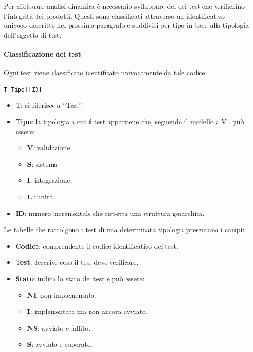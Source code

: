 		Per effettuare analisi dinamica è necessario sviluppare dei dei test che verifichino l'integrità dei prodotti. Questi sono classificati attraverso un identificativo univoco descritto nel prossimo paragrafo e suddivisi per tipo in base alla tipologia dell'oggetto di test.

			\paragraph{Classificazione dei test}\label{ClassificazioneTest}
			Ogni test viene classificato identificato univocamente da tale codice:

			\begin{center}
				\texttt{T[Tipo][ID]}
			\end{center}

			\begin{itemize}
				\item \textbf{T}: si riferisce a ``Test''.
				\item \textbf{Tipo}: la tipologia a cui il test appartiene che, seguendo il modello a V%
				, può essere:
				\begin{itemize}
					\item \textbf{V}: validazione.
					\item \textbf{S}: sistema
					\item \textbf{I}: integrazione.
					\item \textbf{U}: unità.
				\end{itemize}
				\item \textbf{ID}: numero incrementale che rispetta una struttura gerarchica.
			\end{itemize}

			\newcommand{\TNI}{{\color{gray}\textbf{NI}}}
			\newcommand{\TI}{{\color{blue}\textbf{I}}}
			\newcommand{\TNS}{{\color{red}\textbf{NS}}}
			\newcommand{\TS}{{\color{green}\textbf{S}}}

			Le tabelle che raccolgono i test di una determinata tipologia presentano i campi:
			\begin{itemize}
				\item \textbf{Codice}: comprendente il codice identificativo del test.
				\item \textbf{Test}: descrive cosa il test deve verificare.
				\item \textbf{Stato}: indica lo stato del test e può essere:
				\begin{itemize}
					\item \TNI: non implementato.
					\item \TI: implementato ma non ancora avviato.
					\item \TNS: avviato e fallito.
					\item \TS: avviato e superato.
				\end{itemize}
			\end{itemize}

